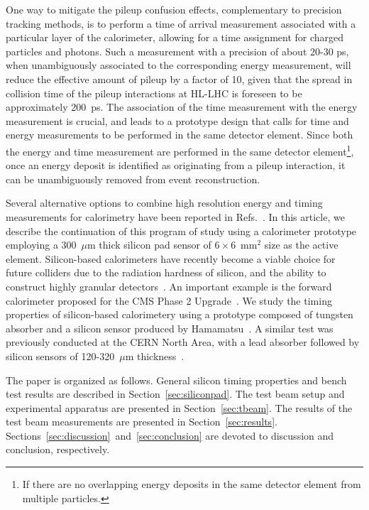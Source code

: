 One way to mitigate the pileup confusion effects, complementary to precision
tracking methods, is to perform a time of arrival measurement associated with a
particular layer of the calorimeter, allowing for a time assignment for 
charged particles and photons. Such a measurement with a precision of about
20-30 ps, when unambiguously associated to the corresponding energy measurement,
will reduce the effective amount of pileup by a factor of 10, given that the
spread in collision time of the pileup interactions at HL-LHC is foreseen to be
approximately 200~ps. The association of the time measurement with the energy
measurement is crucial, and leads to a prototype design that calls for  time
and energy measurements to be performed in the same detector element. Since both
the energy and time measurement are performed in the same detector
element\footnote{If there are no overlapping energy deposits in the same
detector element from multiple particles.}, once
an energy deposit is identified as originating from a pileup interaction, it can
be unambiguously removed from event reconstruction. 

Several alternative options to combine high resolution energy and timing
measurements for calorimetry have been reported in Refs.~\cite{Anderson:2015gha,
MCPFastCaloNIMA, Ronzhin2015288, Ronzhin201552, Brianza2015216, sixie, spiropulu}. In this
article, we describe the continuation of this program of study using a
calorimeter prototype employing a 300~$\mu$m thick silicon pad sensor of
$6\times 6$~mm$^2$ size as the active element. Silicon-based calorimeters have
recently become a viable choice for future colliders due to the radiation
hardness of silicon, and the ability to construct highly granular
detectors~\cite{Adloff:2011ha}. An important example is the forward calorimeter
proposed for the CMS Phase 2 Upgrade~\cite{Butler:2020886}. We study the timing
properties of silicon-based calorimetery using a prototype composed of tungsten
absorber and a silicon sensor produced by Hamamatsu~\cite{hamamatsu}. A similar
test was previously conducted at the CERN North Area, with a lead absorber
followed by silicon sensors of 120-320~$\mu$m thickness~\cite{akchurin, rusack}.

The paper is organized as follows. General silicon timing properties and bench
test results are described in Section~\ref{sec:siliconpad}. The test beam setup
and experimental apparatus are presented in Section~\ref{sec:tbeam}. The results
of the test beam measurements are presented in Section~\ref{sec:results}.
Sections~\ref{sec:discussion}~and~\ref{sec:conclusion} are devoted to discussion
and conclusion, respectively.


